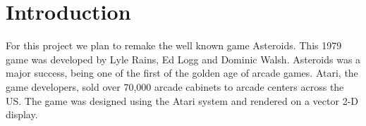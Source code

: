 \documentclass[10pt,conference,onecolumn,compsoc]{IEEEtran}
\begin{document}
\maketitle


\IEEEdisplaynontitleabstractindextext



%
\IEEEpeerreviewmaketitle



\section{Introduction}




% 
% 
% 
% 
For this project we plan to remake the well known game Asteroids. This 1979 game was developed by Lyle Rains, Ed Logg and Dominic Walsh. Asteroids was a major success, being one of the first of the golden age of arcade games. Atari, the game developers, sold over 70,000 arcade cabinets to arcade centers across the US. The game was designed using the Atari system and rendered on a vector 2-D display.
\end{document}
